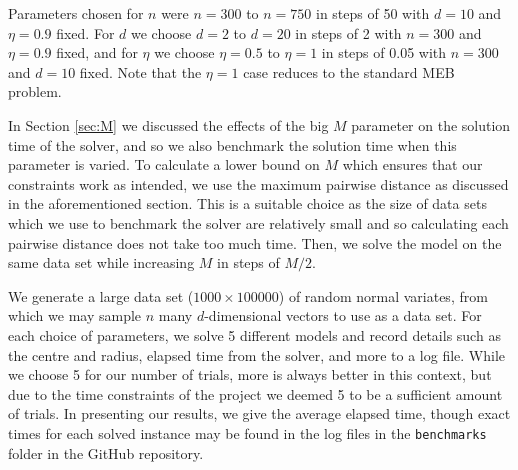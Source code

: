 \documentclass[11pt,twoside]{report}
\theoremstyle{definition}
\numberwithin{theorem}{section}
\numberwithin{definition}{section}
\numberwithin{lemma}{section}
\numberwithin{proposition}{section}
\numberwithin{equation}{section}
\numberwithin{figure}{section}
\begin{document}
Parameters chosen for $n$ were $n=300$ to $n=750$ in steps of 50 with $d=10$ and $\eta=0.9$ fixed. For $d$ we choose $d=2$ to $d=20$ in steps of 2 with $n=300$ and $\eta=0.9$ fixed, and for $\eta$ we choose $\eta=0.5$ to $\eta=1$ in steps of 0.05 with $n=300$ and $d=10$ fixed. Note that the $\eta=1$ case reduces to the standard MEB problem.

In Section \ref{sec:M} we discussed the effects of the big $M$ parameter on the solution time of the solver, and so we also benchmark the solution time when this parameter is varied. To calculate a lower bound on $M$ which ensures that our constraints work as intended, we use the maximum pairwise distance as discussed in the aforementioned section. This is a suitable choice as the size of data sets which we use to benchmark the solver are relatively small and so calculating each pairwise distance does not take too much time. Then, we solve the model on the same data set while increasing $M$ in steps of $M/2$.

We generate a large data set ($1000\times100000$) of random normal variates, from which we may sample $n$ many $d$-dimensional vectors to use as a data set. For each choice of parameters, we solve 5 different models and record details such as the centre and radius, elapsed time from the solver, and more to a log file. While we choose 5 for our number of trials, more is always better in this context, but due to the time constraints of the project we deemed 5 to be a sufficient amount of trials. In presenting our results, we give the average elapsed time, though exact times for each solved instance may be found in the log files in the \texttt{benchmarks} folder in the GitHub repository.
\end{document}
